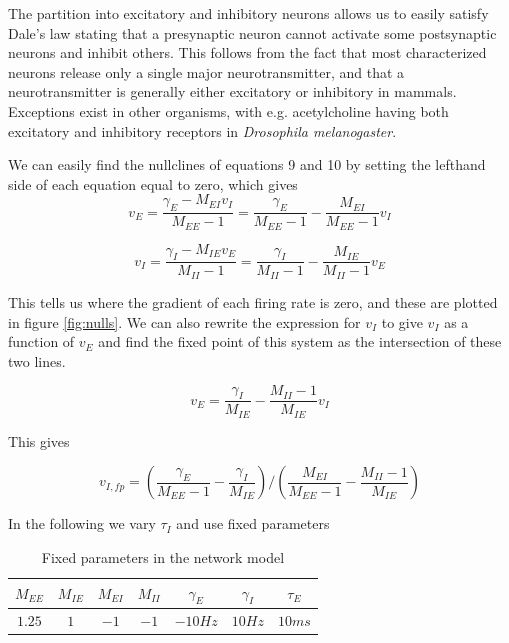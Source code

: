 \documentclass{article}
\begin{document}
The partition into excitatory and inhibitory neurons allows us to easily satisfy Dale's law stating that a presynaptic neuron cannot activate some postsynaptic neurons and inhibit others. This follows from the fact that most characterized neurons release only a single major neurotransmitter, and that a neurotransmitter is generally either excitatory or inhibitory in mammals. Exceptions exist in other organisms, with e.g. acetylcholine having both excitatory and inhibitory receptors in \textit{Drosophila melanogaster}.

We can easily find the nullclines of equations 9 and 10 by setting the lefthand side of each equation equal to zero, which gives
\begin{equation}
v_E = \dfrac{\gamma_E-M_{EI} v_I}{M_{EE}-1} = \dfrac{\gamma_E}{M_{EE}-1}-\dfrac{M_{EI}}{M_{EE}-1} v_I
\end{equation}

\begin{equation}
v_I = \dfrac{ \gamma_I - M_{IE} v_E}{M_{II}-1} = \dfrac{\gamma_I}{M_{II}-1} - \dfrac{M_{IE}}{M_{II}-1} v_E 
\end{equation}

This tells us where the gradient of each firing rate is zero, and these are plotted in figure \ref{fig:nulls}.
We can also rewrite the expression for $v_I$ to give $v_I$ as a function of $v_E$ and find the fixed point of this system as the intersection of these two lines.

\begin{equation}
v_E = \dfrac{\gamma_I}{M_{IE}} - \dfrac{M_{II}-1}{M_{IE}} v_I 
\end{equation}

This gives

\begin{equation}
v_{I,fp} =    ( \dfrac{\gamma_E}{M_{EE}-1} - \dfrac{\gamma_I}{M_{IE}} ) / (\dfrac{M_{EI}}{M_{EE}-1} -  \dfrac{M_{II}-1}{M_{IE}})  
\end{equation}

In the following we vary $\tau_I$ and use fixed parameters

\begin{table}[h]
\centering
\begin{tabular}{ |c|c|c|c|c|c|c|}
\hline
 $M_{EE}$ & $M_{IE}$ & $M_{EI}$ & $M_{II}$ & $\gamma_E$ & $\gamma_I$ & $\tau_E$\\
\hline
$1.25$ & $1$ & $-1$ & $-1$ & $-10 Hz$ & $10 Hz$ & $10 ms$\\
\hline
\end{tabular}
\caption{Fixed parameters in the network model}
\label{tab:params}
\end{table}
\end{document}
